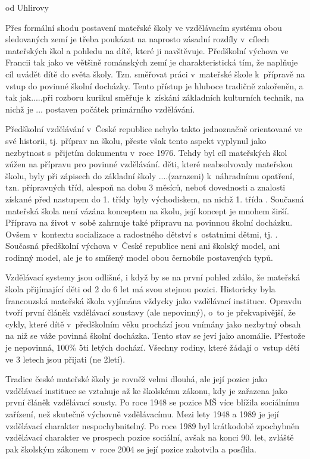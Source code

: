 od Uhlirovy

Přes formální shodu postavení mateřské školy ve vzdělávacím systému obou sledovaných zemí je třeba poukázat na naprosto zásadní rozdíly v~cílech mateřských škol a pohledu na dítě, které ji navštěvuje.
Předškolní výchova ve Francii tak jako ve většině románských zemí je charakteristická tím, že naplňuje cíl uvádět dítě do světa školy. Tzn. směřovat práci v~mateřské škole k~přípravě na vstup do povinné školní docházky. Tento přístup je hluboce tradičně zakořeněn, a tak jak.....při rozboru kurikul směřuje k~získání základních kulturních technik, na nichž je ... postaven počátek primárního vzdělávání. 

Předškolní vzdělávání v~České republice nebylo takto jednoznačně orientované ve své historii, tj. příprav na školu, přeste však tento aspekt vyplynul jako nezbytnost s~přijetím dokumentu  v~roce 1976. Tehdy byl cíl mateřských škol zúžen na přípravu pro povinné vzdělávání. děti, které neabsolvovaly mateřskou školu, byly při zápisech do základní školy ....(zarazeni) k~náhradnímu opatření, tzn. přípravných tříd, alespoň na dobu 3 měsíců, neboť dovednosti a znalosti získané před nastupem do 1. třídy byly východiskem, na nichž 1. třída . Současná mateřská škola není vázána konceptem na školu, její koncept je mnohem širší. Příprava na život v~sobě zahrnuje také připravu na povinnou školní docházku. Ovšem v~kontextu socializace a radostného dětství s~ostatnimi dětmi, tj. . Současná předškolní výchova v~České republice neni ani školský model, ani rodinný model, ale je to smíšený model obou černobíle postavených typů.

Vzdělávací systemy jsou odlišné, i když by se na první pohled zdálo, že mateřská škola přijímající děti od 2 do 6 let má svou stejnou pozici. Historicky byla francouzská mateřská škola vyjímána vždycky jako vzdělávací instituce. Opravdu tvoří první článěk vzdělávací soustavy (ale nepovinný), o~to je překvapivější, že cykly, které dítě v~předškolním věku prochází jsou vnímány jako nezbytný obsah na niž se váže povinná školní docházka. Tento stav se jeví jako anomálie. Přestože je nepovinná, 100\% 5ti letých dochází. Všechny rodiny, které žádají o~vstup dětí ve 3 letech jsou přijati (ne 2letí).

Tradice české mateřské školy je rovněž velmi dlouhá, ale její pozice jako vzdělávací instituce se vztahuje až ke školskému zákonu, kdy je zařazena jako první článěk vzdělávací sousty. Po roce 1948 se pozice MŠ více blížila sociálnímu zařízení, než skutečně výchovně vzdělávacímu. Mezi lety 1948 a 1989 je její vzdělávací charakter nespochybnitelný. Po roce 1989 byl krátkodobě zpochybněn vzdělávací charakter ve prospech pozice sociální, avšak na konci 90. let, zvláště pak školským zákonem v~roce 2004 se její pozice zakotvila a posílila. 